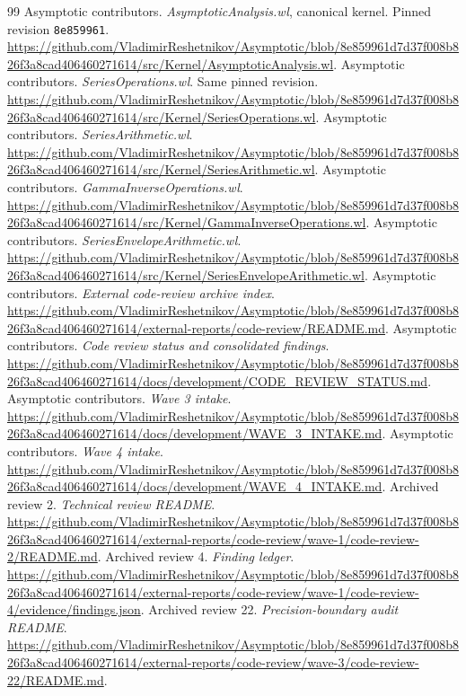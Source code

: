 \documentclass[11pt,letterpaper]{article}
\begin{document}
\newpage
\begin{thebibliography}{99}
\small
{} Asymptotic contributors. \emph{AsymptoticAnalysis.wl}, canonical kernel. Pinned revision \texttt{8e859961}. \url{https://github.com/VladimirReshetnikov/Asymptotic/blob/8e859961d7d37f008b826f3a8cad406460271614/src/Kernel/AsymptoticAnalysis.wl}.
 Asymptotic contributors. \emph{SeriesOperations.wl}. Same pinned revision. \url{https://github.com/VladimirReshetnikov/Asymptotic/blob/8e859961d7d37f008b826f3a8cad406460271614/src/Kernel/SeriesOperations.wl}.
 Asymptotic contributors. \emph{SeriesArithmetic.wl}. \url{https://github.com/VladimirReshetnikov/Asymptotic/blob/8e859961d7d37f008b826f3a8cad406460271614/src/Kernel/SeriesArithmetic.wl}.
 Asymptotic contributors. \emph{GammaInverseOperations.wl}. \url{https://github.com/VladimirReshetnikov/Asymptotic/blob/8e859961d7d37f008b826f3a8cad406460271614/src/Kernel/GammaInverseOperations.wl}.
 Asymptotic contributors. \emph{SeriesEnvelopeArithmetic.wl}. \url{https://github.com/VladimirReshetnikov/Asymptotic/blob/8e859961d7d37f008b826f3a8cad406460271614/src/Kernel/SeriesEnvelopeArithmetic.wl}.
 Asymptotic contributors. \emph{External code-review archive index}. \url{https://github.com/VladimirReshetnikov/Asymptotic/blob/8e859961d7d37f008b826f3a8cad406460271614/external-reports/code-review/README.md}.
 Asymptotic contributors. \emph{Code review status and consolidated findings}. \url{https://github.com/VladimirReshetnikov/Asymptotic/blob/8e859961d7d37f008b826f3a8cad406460271614/docs/development/CODE_REVIEW_STATUS.md}.
 Asymptotic contributors. \emph{Wave 3 intake}. \url{https://github.com/VladimirReshetnikov/Asymptotic/blob/8e859961d7d37f008b826f3a8cad406460271614/docs/development/WAVE_3_INTAKE.md}.
 Asymptotic contributors. \emph{Wave 4 intake}. \url{https://github.com/VladimirReshetnikov/Asymptotic/blob/8e859961d7d37f008b826f3a8cad406460271614/docs/development/WAVE_4_INTAKE.md}.
 Archived review 2. \emph{Technical review README}. \url{https://github.com/VladimirReshetnikov/Asymptotic/blob/8e859961d7d37f008b826f3a8cad406460271614/external-reports/code-review/wave-1/code-review-2/README.md}.
 Archived review 4. \emph{Finding ledger}. \url{https://github.com/VladimirReshetnikov/Asymptotic/blob/8e859961d7d37f008b826f3a8cad406460271614/external-reports/code-review/wave-1/code-review-4/evidence/findings.json}.
 Archived review 22. \emph{Precision-boundary audit README}. \url{https://github.com/VladimirReshetnikov/Asymptotic/blob/8e859961d7d37f008b826f3a8cad406460271614/external-reports/code-review/wave-3/code-review-22/README.md}.

\end{thebibliography}
\end{document}
